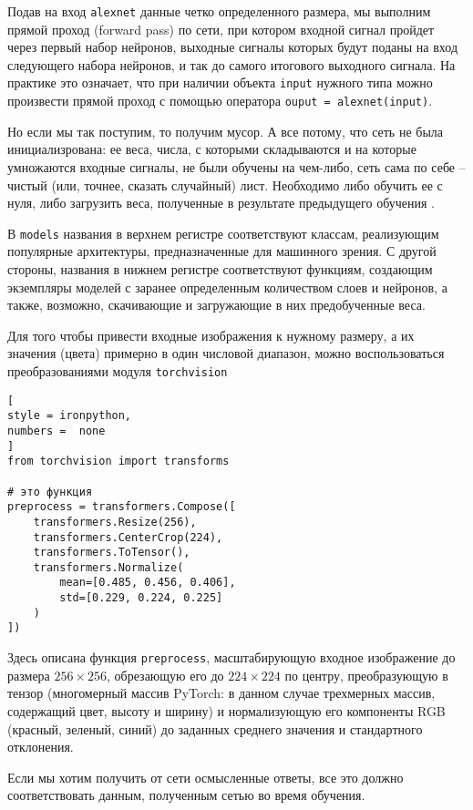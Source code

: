 \documentclass[%
	11pt,
	a4paper,
	utf8,
		]{article}
\begin{document}
Подав на вход \verb|alexnet| данные четко определенного размера, мы выполним прямой проход (forward pass) по сети, при котором входной сигнал пройдет через первый набор нейронов, выходные сигналы которых будут поданы на вход следующего набора нейронов, и так до самого итогового выходного сигнала. На практике это означает, что при наличии объекта \verb|input| нужного типа можно произвести прямой проход с помощью оператора \verb|ouput = alexnet(input)|.

Но если мы так поступим, то получим мусор. А все потому, что сеть не была инициализрована: ее веса, числа, с которыми складываются и на которые умножаются входные сигналы, не были обучены на чем-либо, сеть сама по себе -- чистый (или, точнее, сказать случайный) лист. Необходимо либо обучить ее с нуля, либо загрузить веса, полученные в результате предыдущего обучения \cite[]{pytorch-2022}.

В \verb|models| названия в верхнем регистре соответствуют классам, реализующим популярные архитектуры, предназначенные для машинного зрения. С другой стороны, названия в нижнем регистре соответствуют функциям, создающим экземпляры моделей с заранее определенным количеством слоев и нейронов, а также, возможно, скачивающие и загружающие в них предобученные веса.

Для того чтобы привести входные изображения к нужному размеру, а их значения (цвета) примерно в один числовой диапазон, можно воспользоваться преобразованиями модуля \verb|torchvision|
\begin{lstlisting}[
style = ironpython,
numbers =  none
]
from torchvision import transforms

# это функция
preprocess = transformers.Compose([
    transformers.Resize(256),
    transformers.CenterCrop(224),
    transformers.ToTensor(),
    transformers.Normalize(
        mean=[0.485, 0.456, 0.406],
        std=[0.229, 0.224, 0.225]
    )
])
\end{lstlisting}

Здесь описана функция \verb|preprocess|, масштабирующую входное изображение до размера $256 \times 256$, обрезающую его до $224 \times 224$ по центру, преобразующую в тензор (многомерный массив PyTorch: в данном случае трехмерных массив, содержащий цвет, высоту и ширину) и нормализующую его компоненты RGB (красный, зеленый, синий) до заданных среднего значения и стандартного отклонения.

Если мы хотим получить от сети осмысленные ответы, все это должно соответствовать данным, полученным сетью во время обучения.
\end{document}
